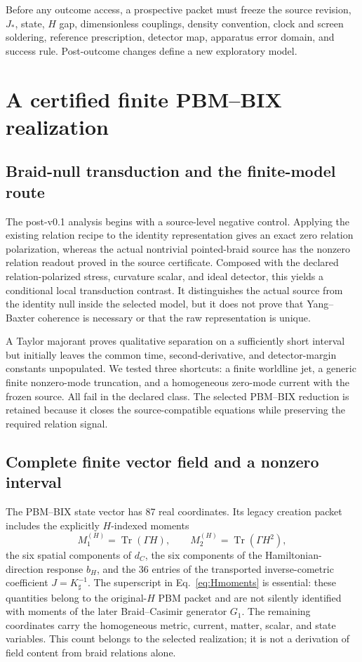 \documentclass[11pt]{article}
\theoremstyle{definition}
\theoremstyle{remark}
\newcommand{\Tr}{\operatorname{Tr}}
\begin{document}
Before any outcome access, a prospective packet must freeze the source revision, $J_*$, state, $H$ gap, dimensionless couplings, density convention, clock and screen soldering, reference prescription, detector map, apparatus error domain, and success rule. Post-outcome changes define a new exploratory model.


\section{A certified finite PBM--BIX realization}

\subsection{Braid-null transduction and the finite-model route}

The post-v0.1 analysis begins with a source-level negative control. Applying the existing relation recipe to the identity representation gives an exact zero relation polarization, whereas the actual nontrivial pointed-braid source has the nonzero relation readout proved in the source certificate. Composed with the declared relation-polarized stress, curvature scalar, and ideal detector, this yields a conditional local transduction contrast. It distinguishes the actual source from the identity null inside the selected model, but it does not prove that Yang--Baxter coherence is necessary or that the raw representation is unique.

A Taylor majorant proves qualitative separation on a sufficiently short interval but initially leaves the common time, second-derivative, and detector-margin constants unpopulated. We tested three shortcuts: a finite worldline jet, a generic finite nonzero-mode truncation, and a homogeneous zero-mode current with the frozen source. All fail in the declared class. The selected PBM--BIX reduction is retained because it closes the source-compatible equations while preserving the required relation signal.

\subsection{Complete finite vector field and a nonzero interval}

The PBM--BIX state vector has 87 real coordinates. Its legacy creation packet includes the explicitly $H$-indexed moments
\begin{equation}\label{eq:Hmoments}
 M_1^{(H)}=\Tr(\Gamma H),\qquad M_2^{(H)}=\Tr(\Gamma H^2),
\end{equation}
the six spatial components of $d_C$, the six components of the Hamiltonian-direction response $b_H$, and the 36 entries of the transported inverse-cometric coefficient $J=K_\sharp^{-1}$. The superscript in Eq.~\eqref{eq:Hmoments} is essential: these quantities belong to the original-$H$ PBM packet and are not silently identified with moments of the later Braid--Casimir generator $G_1$. The remaining coordinates carry the homogeneous metric, current, matter, scalar, and state variables. This count belongs to the selected realization; it is not a derivation of field content from braid relations alone.
\end{document}
